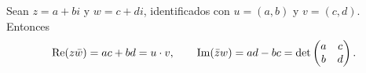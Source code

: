 \begin{proposicion}\label{prop:escalar-complejo}
Sean $z=a+bi$ y $w=c+di$, identificados con $u=(a,b)$ y $v=(c,d)$. Entonces
\[
\operatorname{Re}(z\bar w)=ac+bd=u\cdot v,\qquad \operatorname{Im}(\bar z w)=ad-bc=\det\begin{pmatrix}a&c\\ b&d\end{pmatrix}.
\]
\end{proposicion}

\addtocounter{definicion}{1}%

\addtocounter{definicion}{1}%

